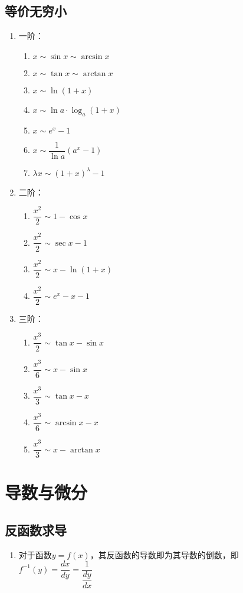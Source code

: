\documentclass[12pt,a4paper,UTF8]{book}
\begin{document}
\subsection{等价无穷小}
\begin{enumerate}
\item 一阶：
\begin{enumerate}
\item $x\sim\sin x\sim\arcsin x$
\item $x\sim\tan x\sim\arctan x$
\item $x\sim\ln\left(1+x\right)$
\item $x\sim\ln a\cdot\log_a\left(1+x\right)$
\item $x\sim e^x-1$
\item $x\sim\dfrac{1}{\ln a}\left(a^x-1\right)$
\item $\lambda x\sim\left(1+x\right)^\lambda-1$
\end{enumerate}
\item 二阶：
\begin{enumerate}
\item $\dfrac{x^2}{2}\sim 1-\cos x$
\item $\dfrac{x^2}{2}\sim\sec x-1$
\item $\dfrac{x^2}{2}\sim x-\ln\left(1+x\right)$
\item $\dfrac{x^2}{2}\sim e^x-x-1$
\end{enumerate}
\item 三阶：
\begin{enumerate}
\item $\dfrac{x^3}{2}\sim\tan x-\sin x$
\item $\dfrac{x^3}{6}\sim x-\sin x$
\item $\dfrac{x^3}{3}\sim\tan x-x$
\item $\dfrac{x^3}{6}\sim\arcsin x-x$
\item $\dfrac{x^3}{3}\sim x-\arctan x$
\end{enumerate}
\end{enumerate}


\section{导数与微分}
\subsection{反函数求导}
\begin{enumerate}
\item 对于函数$y=f\left(x\right)$，其反函数的导数即为其导数的倒数，即$f^{-1}\left(y\right)=\dfrac{dx}{dy}=\dfrac{1}{\dfrac{dy}{dx}}$
\end{enumerate}
\end{document}
